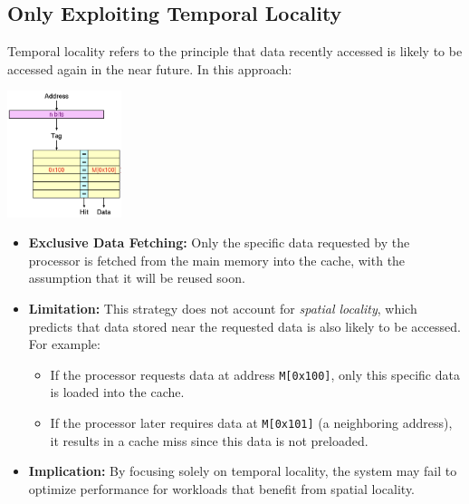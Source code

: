 \subsection{Only Exploiting Temporal Locality}
Temporal locality refers to the principle that data recently accessed is likely to be accessed again in the near future. In this approach:
\begin{center}
    \includegraphics[width=0.25\textwidth]{chapters/chapter3a/images/temporal.png}
\end{center}
\begin{itemize}
    \item \textbf{Exclusive Data Fetching:} Only the specific data requested by the processor is fetched from the main memory into the cache, with the assumption that it will be reused soon.
    
    \item \textbf{Limitation:} This strategy does not account for \textit{spatial locality}, which predicts that data stored near the requested data is also likely to be accessed. For example:
    \begin{itemize}
        \item If the processor requests data at address \texttt{M[0x100]}, only this specific data is loaded into the cache.
        \item If the processor later requires data at \texttt{M[0x101]} (a neighboring address), it results in a cache miss since this data is not preloaded.
    \end{itemize}
    
    \item \textbf{Implication:} By focusing solely on temporal locality, the system may fail to optimize performance for workloads that benefit from spatial locality.
\end{itemize}
